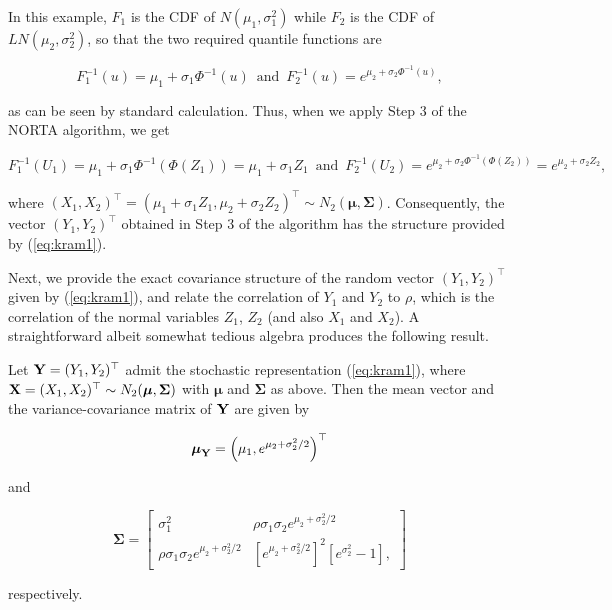 \documentclass[
]{jss}
\begin{document}
In this example, \(F_1\) is the CDF of \(N(\mu_1, \sigma_1^2)\) while
\(F_2\) is the CDF of \(LN(\mu_2, \sigma_2^2)\), so that the two
required quantile functions are

\begin{equation}
\label{eq:kram4}
F_1^{-1}(u) = \mu_1+\sigma_1 \Phi^{-1}(u)\,\,\, \mbox{and} \,\,\, F_2^{-1}(u) = e^{\mu_2+\sigma_2 \Phi^{-1}(u)}, 
\end{equation}

as can be seen by standard calculation. Thus, when we apply Step 3 of
the NORTA algorithm, we get

\begin{equation}
\label{eq:kram5}
F_1^{-1}(U_1) = \mu_1+\sigma_1 \Phi^{-1}(\Phi(Z_1)) =  \mu_1+\sigma_1 Z_1 \,\,\, \mbox{and} \,\,\, F_2^{-1}(U_2) = e^{\mu_2+\sigma_2 \Phi^{-1}(\Phi(Z_2))} = e^{\mu_2+\sigma_2 Z_2}, 
\end{equation}

where
\((X_1, X_2)^\top = (\mu_1+\sigma_1 Z_1, \mu_2+\sigma_2 Z_2)^\top \sim N_2(\boldsymbol \mu, \boldsymbol \Sigma)\).
Consequently, the vector \((Y_1, Y_2)^\top\) obtained in Step 3 of the
algorithm has the structure provided by (\ref{eq:kram1}).

\vspace{0.1in}

\noindent Next, we provide the exact covariance structure of the random
vector \((Y_1, Y_2)^\top\) given by (\ref{eq:kram1}), and relate the
correlation of \(Y_1\) and \(Y_2\) to \(\rho\), which is the correlation
of the normal variables \(Z_1\), \(Z_2\) (and also \(X_1\) and \(X_2\)).
A straightforward albeit somewhat tedious algebra produces the following
result.

\begin{lemma}
Let ${\bf Y} = (Y_1, Y_2)^\top$ admit the stochastic representation (\ref{eq:kram1}), where ${\bf X} = (X_1, X_2)^\top \sim N_2(\boldsymbol \mu, \boldsymbol \Sigma)$ with $\boldsymbol \mu$ and $\boldsymbol \Sigma$ as above. Then the mean vector and the variance-covariance matrix of ${\bf Y}$ are given by 

\begin{equation}
\label{eq:kram6}
\boldsymbol \mu_{{\bf Y}} = \left(\mu_1, e^{\mu_2+\sigma_2^2/2}\right)^\top
\end{equation}

and 

\begin{equation}
\label{eq:kram7}
\boldsymbol \Sigma = 
\begin{bmatrix}
\sigma_1^2 & \rho \sigma_1\sigma_2  e^{\mu_2+\sigma_2^2/2}  \\
\rho \sigma_1\sigma_2 e^{\mu_2+\sigma_2^2/2} & \left[ e^{\mu_2+\sigma_2^2/2}\right]^2 \left[e^{\sigma_2^2} -1 \right],
\end{bmatrix}
\end{equation}

respectively. 
\end{lemma}
\end{document}
